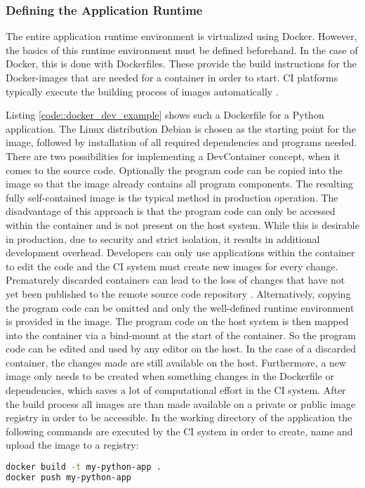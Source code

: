         \subsubsection{Defining the Application Runtime}
        The entire application runtime environment is virtualized using Docker. However, the basics of this runtime environment must be defined beforehand. In the case of Docker, this is done with Dockerfiles. These provide the build instructions for the Docker-images that are needed for a container in order to start. \ac{CI} platforms typically execute the building process of images automatically \cite{docker2020}.\newline
        
        Listing \ref{code::docker_dev_example} shows such a Dockerfile for a Python application. The Linux distribution Debian is chosen as the starting point for the image, followed by installation of all required dependencies and programs needed. There are two possibilities for implementing a DevContainer concept, when it comes to the source code. Optionally the program code can be copied into the image so that the image already contains all program components. The resulting fully self-contained image is the typical method in production operation. The disadvantage of this approach is that the program code can only be accessed within the container and is not present on the host system. While this is desirable in production, due to security and strict isolation, it results in additional development overhead. Developers can only use applications within the container to edit the code and the \ac{CI} system must create new images for every change. Prematurely discarded containers can lead to the loss of changes that have not yet been published to the remote source code repository \cite{dockerdocs}.\newline
        Alternatively, copying the program code can be omitted and only the well-defined runtime environment is provided in the image. The program code on the host system is then mapped into the container via a bind-mount at the start of the container. So the program code can be edited and used by any editor on the host. In the case of a discarded container, the changes made are still available on the host. Furthermore, a new image only needs to be created when something changes in the Dockerfile or dependencies, which saves a lot of computational effort in the \ac{CI} system. After the build process all images are than made available on a private or public image registry in order to be accessible. In the working directory of the application the following commands are executed by the \ac{CI} system in order to create, name and upload the image to a registry:
        \begin{lstlisting}[language=bash, frame=none, numbers=none, backgroundcolor=\color{codebg}]
docker build -t my-python-app .
docker push my-python-app
        \end{lstlisting}
        \vspace{-1cm}

